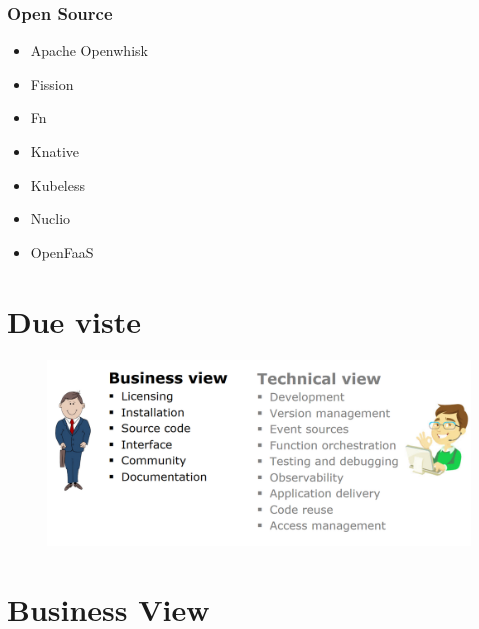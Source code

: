 \documentclass[a4paper, 12pt]{report}
\begin{document}
          \subsubsection{Open Source}
          \begin{itemize}
            \item Apache Openwhisk
            \item Fission
            \item Fn
            \item Knative
            \item Kubeless
            \item Nuclio
            \item OpenFaaS
          \end{itemize}
          \section{Due viste}
          \begin{figure}[h]
            \centering
            \includegraphics[scale=0.3]{Immagini/TwoViews.png}
          \end{figure}
          \section{Business View}
\end{document}
